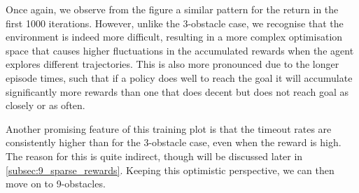 Once again, we observe from the figure a similar pattern for the return in the first 1000 iterations. However, unlike the 3-obstacle case, we recognise that the environment is indeed more difficult, resulting in a more complex optimisation space that causes higher fluctuations in the accumulated rewards when the agent explores different trajectories. This is also more pronounced due to the longer episode times, such that if a policy does well to reach the goal it will accumulate significantly more rewards than one that does decent but does not reach goal as closely or as often.

Another promising feature of this training plot is that the timeout rates are consistently higher than for the 3-obstacle case, even when the reward is high. The reason for this is quite indirect, though will be discussed later in \cref{subsec:9_sparse_rewards}.
Keeping this optimistic perspective, we can then move on to 9-obstacles.


